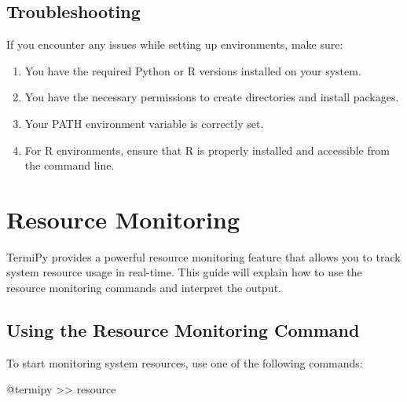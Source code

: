 \documentclass[
  letterpaper,
  DIV=11,
  numbers=noendperiod]{scrreprt}
\newenvironment{Shaded}{\begin{snugshade}}{\end{snugshade}}
\newcommand{\ExtensionTok}[1]{\textcolor[rgb]{0.00,0.23,0.31}{#1}}
\newcommand{\NormalTok}[1]{\textcolor[rgb]{0.00,0.23,0.31}{#1}}
\newcommand{\OperatorTok}[1]{\textcolor[rgb]{0.37,0.37,0.37}{#1}}
\providecommand{\tightlist}{%
  \setlength{\itemsep}{0pt}\setlength{\parskip}{0pt}}\usepackage{longtable,booktabs,array}
\begin{document}
\section*{Troubleshooting}\label{troubleshooting}


If you encounter any issues while setting up environments, make sure:

\begin{enumerate}
\def\labelenumi{\arabic{enumi}.}
\tightlist
\item
  You have the required Python or R versions installed on your system.
\item
  You have the necessary permissions to create directories and install
  packages.
\item
  Your PATH environment variable is correctly set.
\item
  For R environments, ensure that R is properly installed and accessible
  from the command line.
\end{enumerate}


\chapter*{Resource Monitoring}\label{resource-monitoring}


TermiPy provides a powerful resource monitoring feature that allows you
to track system resource usage in real-time. This guide will explain how
to use the resource monitoring commands and interpret the output.

\section*{Using the Resource Monitoring
Command}\label{using-the-resource-monitoring-command}


To start monitoring system resources, use one of the following commands:

\begin{Shaded}
\begin{Highlighting}[]
\ExtensionTok{@termipy} \OperatorTok{\textgreater{}\textgreater{}}\NormalTok{ resource}
\end{Highlighting}
\end{Shaded}
\end{document}

